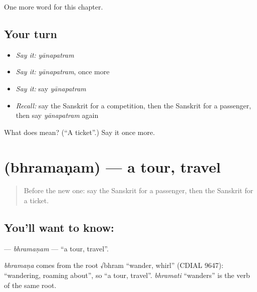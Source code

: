 \begin{grammarlens}[title={What you've built}]
One more word for this chapter.
\end{grammarlens}

\subsection*{Your turn}
\begin{itemize}
\raggedright
  \item \emph{Say it:} \emph{yānapatram}
  \item \emph{Say it:} \emph{yānapatram}, once more
  \item \emph{Say it:} say \emph{yānapatram}
  \item \emph{Recall:} say the Sanskrit for a competition, then the Sanskrit for a passenger, then say \emph{yānapatram} again
\end{itemize}

\begin{tcolorbox}[breakable,colback=teal!4,colframe=teal!35!black,title={Before you move on}]
What does  mean? (\textquotedblleft{}A ticket\textquotedblright{}.) Say it once more.
\end{tcolorbox}
\section[\texorpdfstring{\sk{भ्रमणम्} (bhramaṇam)}{भ्रमणम् (bhramaṇam)}]{ (bhramaṇam) — a tour, travel}

\label{lesson:SA-C172-bhramanam}



\begin{quote}
Before the new one: say the Sanskrit for a passenger, then the Sanskrit for a ticket.
\end{quote}

\subsection*{You'll want to know: }
\textbf{} — \emph{bhramaṇam} — \textquotedblleft{}a tour, travel\textquotedblright{}.

\begin{cousinweb}
\emph{bhramaṇa} comes from the root √bhram \textquotedblleft{}wander, whirl\textquotedblright{} (CDIAL 9647): \textquotedblleft{}wandering, roaming about\textquotedblright{}, so \textquotedblleft{}a tour, travel\textquotedblright{}. \emph{bhramati} \textquotedblleft{}wanders\textquotedblright{} is the verb of the same root.
\end{cousinweb}

